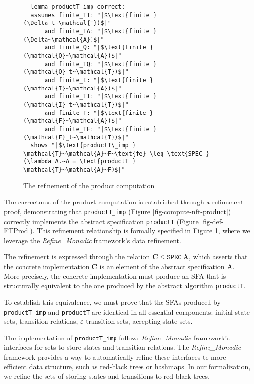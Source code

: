 \documentclass[a4paper,UKenglish,cleveref, autoref, anonymous, thm-restate]{lipics-v2021}
\begin{document}
  \begin{figure}[hbt!]
    \begin{lstlisting}
  lemma productT_imp_correct:
  assumes finite_TT: "|$\text{finite } (\Delta_t~\mathcal{T})$|"    
      and finite_TA: "|$\text{finite } (\Delta~\mathcal{A})$|"
      and finite_Q: "|$\text{finite } (\mathcal{Q}~\mathcal{A})$|"
      and finite_TQ: "|$\text{finite } (\mathcal{Q}_t~\mathcal{T})$|"
      and finite_I: "|$\text{finite } (\mathcal{I}~\mathcal{A})$|"
      and finite_TI: "|$\text{finite } (\mathcal{I}_t~\mathcal{T})$|"
      and finite_F: "|$\text{finite } (\mathcal{F}~\mathcal{A})$|"
      and finite_TF: "|$\text{finite } (\mathcal{F}_t~\mathcal{T})$|"
  shows "|$\text{productT\_imp } \mathcal{T}~\mathcal{A}~F~\text{fe} \leq \text{SPEC } (\lambda A.~A = \text{productT } \mathcal{T}~\mathcal{A}~F)$|"
  \end{lstlisting}
  \caption{The refinement of the product computation}
  \label{fig-def-productT_imp_correct}
  \end{figure}

  The correctness of the product computation is established through a refinement proof, demonstrating that \texttt{productT\_imp} (Figure \ref{fig-compute-nft-product}) correctly implements the abstract specification \texttt{productT} (Figure \ref{fig-def-FTProd}). This refinement relationship is formally specified in Figure \ref{fig-def-productT_imp_correct}, where we leverage the \emph{Refine\_Monadic} framework's data refinement.

  The refinement is expressed through the relation $\mathbf{C} \leq \texttt{SPEC}~\mathbf{A}$, which asserts that the concrete implementation $\mathbf{C}$ is an element of the abstract specification $\mathbf{A}$. More precisely,  the concrete implementation must produce an SFA that is structurally equivalent to the one produced by the abstract algorithm \texttt{productT}.

  To establish this equivalence, we must prove that the SFAs produced by \texttt{productT\_imp} and \texttt{productT} are identical in all essential components:
  initial state sets, transition relations, $\varepsilon$-transition sets, accepting state sets.


The implementation of \texttt{productT\_imp} follows \emph{Refine\_Monadic} framework's interfaces for sets to store states and transition relations. 
The \emph{Refine\_Monadic} framework provides a way to automatically refine these interfaces to more efficient data structure, such as red-black trees or hashmaps. 
In our formalization, we refine the sets of storing states and transitions to red-black trees.
\end{document}
